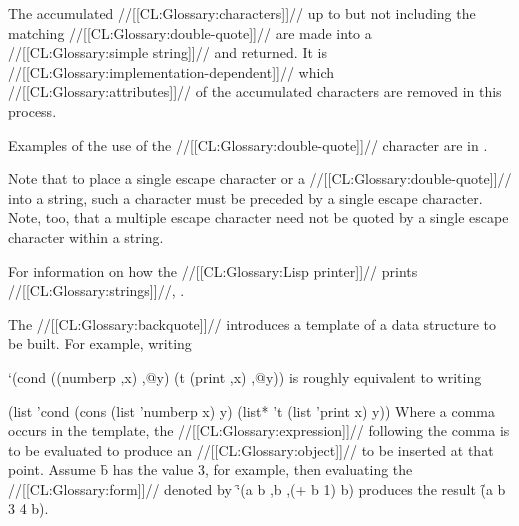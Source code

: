 The accumulated //[[CL:Glossary:characters]]// 
up to but not including the matching //[[CL:Glossary:double-quote]]// 
are made into a //[[CL:Glossary:simple string]]// and returned.
It is //[[CL:Glossary:implementation-dependent]]//
which //[[CL:Glossary:attributes]]// of the accumulated characters are removed in this process.


Examples of the use of the //[[CL:Glossary:double-quote]]// character are in \thenextfigure. 


Note that to place a single escape character or a //[[CL:Glossary:double-quote]]// into a string,
such a character must be preceded by a single escape character.
Note, too, that a multiple escape character need not be quoted by a 
single escape character within a string.








For information on how the //[[CL:Glossary:Lisp printer]]// prints //[[CL:Glossary:strings]]//,
\seesection\PrintingStrings.

\endsubsection%




The //[[CL:Glossary:backquote]]// introduces a template of a data structure to be built.  
For example, writing

\code
 `(cond ((numberp ,x) ,@y) (t (print ,x) ,@y))
\endcode
is roughly equivalent to writing

\code
 (list 'cond 
       (cons (list 'numberp x) y) 
       (list* 't (list 'print x) y))
\endcode
Where a comma
occurs in the template, 
the //[[CL:Glossary:expression]]//
following the comma is to be evaluated to produce an //[[CL:Glossary:object]]// to
be inserted at that point.  Assume \f{b} has the value 3, for example, then
evaluating the //[[CL:Glossary:form]]// denoted by \f{`(a b ,b ,(+ b 1) b)} produces
the result \f{(a b 3 4 b)}.



